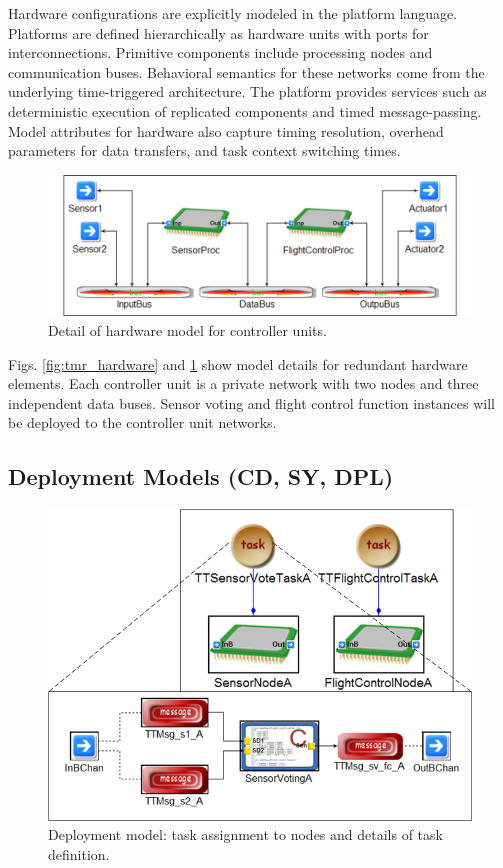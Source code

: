 Hardware configurations are explicitly modeled in the platform language.  Platforms are defined hierarchically as hardware units with ports for interconnections. Primitive components include processing nodes and communication buses.  Behavioral semantics for these networks come from the underlying time-triggered architecture.  The platform provides services such as deterministic execution of replicated components and timed message-passing.  Model attributes for hardware also capture timing resolution, overhead parameters for data transfers, and task context switching times.

\begin{figure}
	\centering
   \includegraphics[width=0.8\columnwidth]{diagrams/platformex.png}
   \caption{Detail of hardware model for controller units.}
   \label{fig:platformex}
\end{figure}

Figs. \ref{fig:tmr_hardware} and \ref{fig:platformex} show model details for redundant hardware elements.  Each controller unit is a private network with two nodes and three independent data buses.
Sensor voting and flight control function instances will be deployed to the controller unit networks.

\subsection{Deployment Models (CD, SY, DPL)}

\begin{figure}
	\centering
   \includegraphics[width=0.55\columnwidth]{diagrams/tmr_deploy.png}
   \caption{Deployment model: task assignment to nodes and details of task definition.}
   \label{fig:tmr_deploy}
\end{figure}

